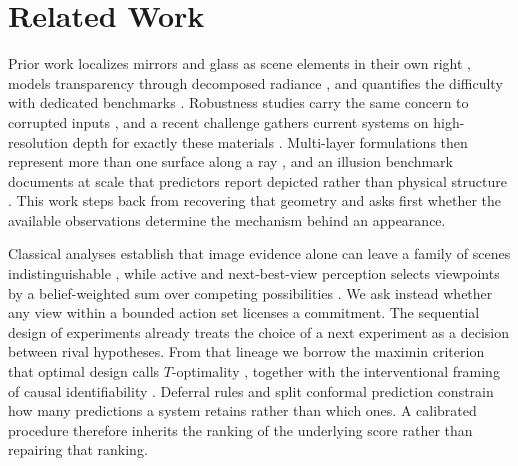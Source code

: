 \documentclass{article} %
\theoremstyle{defstyle}
\theoremstyle{plain}
\begin{document}
\section{Related Work}
\label{sec:related}

Prior work localizes mirrors and glass as scene elements in their own right
\citep{mirrornet2019,glassdetection2020,mirror3d2021}, models transparency through
decomposed radiance \citep{glint2026}, and quantifies the difficulty with dedicated
benchmarks \citep{booster2023,clearpose2022,dreds2022}. Robustness studies carry the same
concern to corrupted inputs \citep{robodepth2023}, and a recent challenge gathers current
systems on high-resolution depth for exactly these materials \citep{ntire2025depth}.
Multi-layer formulations then represent more than one surface along a ray
\citep{layereddepth2025,seegroup2026,depthfocus2026}, and an illusion benchmark documents at
scale that predictors report depicted rather than physical structure \citep{illusion2025}.
This work steps back from recovering that geometry and asks first whether the
available observations determine the mechanism behind an appearance.

Classical analyses establish that image evidence alone can leave a family of scenes
indistinguishable
\citep{belhumeur1999basrelief,sturm1997critical,oren1997theory,kutulakos2008theory}, while
active and next-best-view perception selects viewpoints by a belief-weighted sum over competing
possibilities \citep{nbvreflective2022,rainforth2024}. We ask instead whether any view within a
bounded action set licenses a commitment. The sequential design of experiments
\citep{chernoff1959sequential} already treats the choice of a next experiment as a decision
between rival hypotheses. From that lineage we borrow the maximin criterion that optimal design
calls $T$-optimality \citep{atkinson1975design,hunter1965experimental}, together with the
interventional framing of causal identifiability \citep{citris2022}. Deferral rules
\citep{chow1970,geifman2017,selectivenet2019} and split conformal prediction
\citep{vovk2005,lei2018} constrain how many predictions a system retains rather than which
ones. A calibrated procedure therefore inherits the ranking of the underlying score rather than
repairing that ranking.

\end{document}
